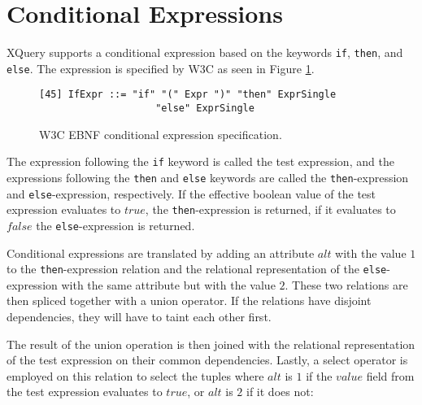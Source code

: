 \section{Conditional Expressions}
\label{sect:trans:TD:ifThenElse}
XQuery supports a conditional expression based on the keywords \texttt{if}, \texttt{then}, and \texttt{else}. The
expression is specified by W3C as seen in Figure \ref{fig:trans:TD:condEBNF}.

\begin{figure}[h]
\begin{Verbatim}
[45] IfExpr ::= "if" "(" Expr ")" "then" ExprSingle 
                    "else" ExprSingle
\end{Verbatim}

\caption{W3C EBNF conditional expression specification\cite{w3c00}. \label{fig:trans:TD:condEBNF}}
\end{figure}

The expression following the \texttt{if} keyword is called the test expression, and the expressions following the
\texttt{then} and \texttt{else} keywords are called the \texttt{then}-expression and \texttt{else}-expression,
respectively. If the effective boolean value of the test expression evaluates to $true$, the
\texttt{then}-expression is returned, if it evaluates to $false$ the \texttt{else}-expression is returned.

Conditional expressions are translated by adding an attribute $alt$ with the value $1$ to the
\texttt{then}-expression relation and the relational representation of the \texttt{else}-expression with the same
attribute but with the value $2$. These two relations are then spliced together with a \textsf{union} operator. If
the relations have disjoint dependencies, they will have to taint each other first.

The result of the \textsf{union} operation is then joined with the relational representation of the test
expression on their common dependencies. Lastly, a \textsf{select} operator is employed on this relation to select
the tuples where $alt$ is $1$ if the $value$ field from the test expression evaluates to $true$, or $alt$ is $2$
if it does not:

